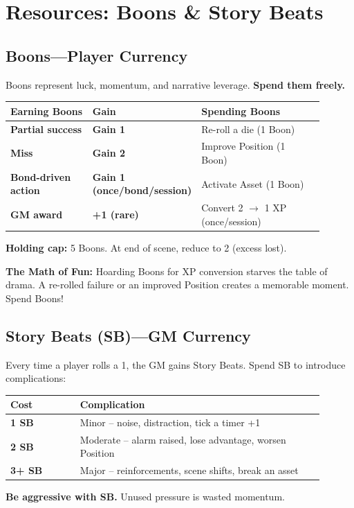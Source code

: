 \documentclass[10pt,twocolumn]{article} %
\begin{document}
\section{Resources: Boons \& Story Beats}

\subsection{Boons---Player Currency}
Boons represent luck, momentum, and narrative leverage. \textbf{Spend them freely.}
\begin{coretable}
\begin{tabular}{>{\bfseries}p{0.3\linewidth} >{\bfseries}p{0.15\linewidth} p{0.45\linewidth}}
\toprule
\textbf{Earning Boons} & \textbf{Gain} & \textbf{Spending Boons} \\
\midrule
Partial success & Gain 1 & Re-roll a die (1 Boon) \\
Miss & Gain 2 & Improve Position (1 Boon) \\
Bond-driven action & Gain 1 (once/bond/session) & Activate Asset (1 Boon) \\
GM award & +1 (rare) & Convert 2 $\to$ 1 XP (once/session) \\
\bottomrule
\end{tabular}
\end{coretable}
\textbf{Holding cap:} 5 Boons. At end of scene, reduce to 2 (excess lost).

\begin{sidebar}
    \textbf{The Math of Fun:} Hoarding Boons for XP conversion starves the table of drama. A re-rolled failure or an improved Position creates a memorable moment. Spend Boons!
\end{sidebar}

\subsection{Story Beats (SB)---GM Currency}
Every time a player rolls a 1, the GM gains Story Beats. Spend SB to introduce complications:
\begin{coretable}
\begin{tabular}{>{\bfseries}p{0.2\linewidth} p{0.7\linewidth}}
\toprule
\textbf{Cost} & \textbf{Complication} \\
\midrule
1 SB & Minor -- noise, distraction, tick a timer +1 \\
2 SB & Moderate -- alarm raised, lose advantage, worsen Position \\
3+ SB & Major -- reinforcements, scene shifts, break an asset \\
\bottomrule
\end{tabular}
\end{coretable}
\textbf{Be aggressive with SB.} Unused pressure is wasted momentum.
\end{document}
